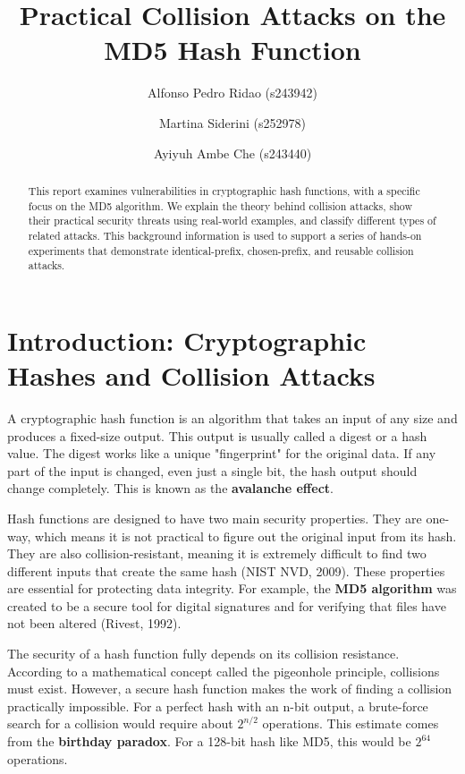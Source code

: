 \documentclass[runningheads]{llncs}
\begin{document}
    \title{Practical Collision Attacks on the MD5 Hash Function}
    \author{Alfonso Pedro Ridao (s243942) \and Martina Siderini (s252978) \and Ayiyuh Ambe Che (s243440)}

    \maketitle

    \begin{abstract}
        This report examines vulnerabilities in cryptographic hash functions, with a specific focus on the MD5 algorithm. We explain the theory behind collision attacks, show their practical security threats using real-world examples, and classify different types of related attacks. This background information is used to support a series of hands-on experiments that demonstrate identical-prefix, chosen-prefix, and reusable collision attacks.
    \end{abstract}

    \section{Introduction: Cryptographic Hashes and Collision Attacks}

    A cryptographic hash function is an algorithm that takes an input of any size and produces a fixed-size output. This output is usually called a digest or a hash value. The digest works like a unique "fingerprint" for the original data. If any part of the input is changed, even just a single bit, the hash output should change completely. This is known as the \textbf{avalanche effect}.

    Hash functions are designed to have two main security properties. They are one-way, which means it is not practical to figure out the original input from its hash. They are also collision-resistant, meaning it is extremely difficult to find two different inputs that create the same hash (NIST NVD, 2009). These properties are essential for protecting data integrity. For example, the \textbf{MD5 algorithm} was created to be a secure tool for digital signatures and for verifying that files have not been altered (Rivest, 1992).

    The security of a hash function fully depends on its collision resistance. According to a mathematical concept called the pigeonhole principle, collisions must exist. However, a secure hash function makes the work of finding a collision practically impossible. For a perfect hash with an n-bit output, a brute-force search for a collision would require about $2^{n/2}$ operations. This estimate comes from the \textbf{birthday paradox}. For a 128-bit hash like MD5, this would be $2^{64}$ operations.
\end{document}
